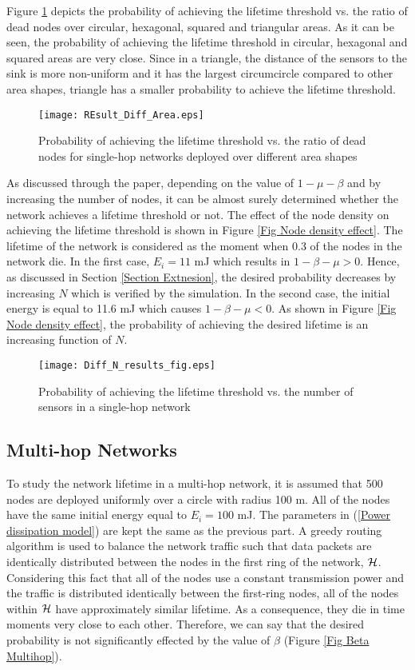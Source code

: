 \documentclass[conference]{IEEEtran}
\begin{document}
Figure \ref{Beta Diff area shapes} depicts the probability of
achieving the lifetime threshold vs. the ratio of dead nodes over
circular, hexagonal, squared and triangular areas. As it can be
seen, the probability of achieving the lifetime threshold in
circular, hexagonal and squared areas are very close. Since in a
triangle, the distance of the sensors to the sink is more
non-uniform and it has the largest circumcircle compared to other
area shapes, triangle has a smaller probability to achieve the
lifetime threshold.

\begin{figure}[!h]
\centering
\texttt{[image: REsult\_Diff\_Area.eps]}
\caption{Probability of achieving the lifetime threshold vs. the
ratio of dead nodes for single-hop networks deployed over different
area shapes} \label{Beta Diff area shapes}
\end{figure}

As discussed through the paper, depending on the value of $1 - \mu -
\beta$ and by increasing the number of nodes, it can be almost
surely determined whether the network achieves a lifetime threshold
or not. The effect of the node density on achieving the lifetime
threshold is shown in Figure \ref{Fig Node density effect}. The
lifetime of the network is considered as the moment when 0.3 of the
nodes in the network die. In the first case, $E_i = 11$ mJ which
results in $1 - \beta - \mu > 0$. Hence, as discussed in Section
\ref{Section Extnesion}, the desired probability decreases by
increasing $N$ which is verified by the simulation. In the second
case, the initial energy is equal to 11.6 mJ which causes $1 - \beta
- \mu < 0$. As shown in Figure \ref{Fig Node density effect},
the probability of achieving the desired lifetime is an increasing
function of $N$.

\begin{figure}[!h]
\centering
\texttt{[image: Diff\_N\_results\_fig.eps]}
\caption{Probability of achieving the lifetime threshold vs. the
number of sensors in a single-hop network} \label{Fig Node density
effect}
\end{figure}

\subsection{Multi-hop Networks}
To study the network lifetime in a multi-hop network, it is assumed
that 500 nodes are deployed uniformly over a circle with radius 100 m. All of the nodes have the same initial energy
equal to $E_i = 100$ mJ. The parameters in (\ref{Power dissipation
model}) are kept the same as the previous part. A greedy routing
algorithm is used to balance the network traffic such that data
packets are identically distributed between the nodes in the first
ring of the network, $\cal{H}$. Considering this fact that all of
the nodes use a constant transmission power and the traffic is
distributed identically between the first-ring nodes, all of the
nodes within $\cal{H}$ have approximately similar lifetime. As a
consequence, they die in time moments very close to each other.
Therefore, we can say that the desired probability is not
significantly effected by the value of $\beta$ (Figure \ref{Fig Beta
Multihop}).
\end{document}

